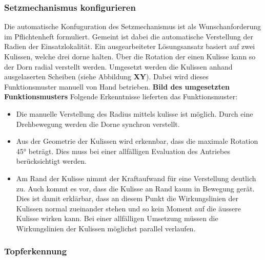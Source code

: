 \subsubsection{Setzmechanismus konfigurieren}
Die automatische Konfuguration des Setzmechanismus ist als Wunschanforderung im Pflichtenheft formuliert. Gemeint ist dabei die automatische Verstellung der Radien der Einsatzlokalität. Ein ausgearbeiteter Lösungsansatz basiert auf zwei Kulissen, welche drei dorne halten. Über die Rotation der einen Kulisse kann so der Dorn radial verstellt werden. Umgesetzt werden die Kulissen anhand ausgelaserten Scheiben (siehe Abbildung \textbf{XY}). Dabei wird dieses Funktionsmuster manuell von Hand betrieben.
\newline
\textbf{Bild des umgesetzten Funktionsmusters}
\newline
Folgende Erkenntnisse lieferten das Funktionsmuster:
\begin{itemize}
	\item Die manuelle Verstellung des Radius mittels kulisse ist möglich. Durch eine Drehbewegung werden die Dorne synchron verstellt.
	
	\item Aus der Geometrie der Kulissen wird erkennbar, dass die maximale Rotation 45° beträgt. Dies muss bei einer allfälligen Evaluation des Antriebes berücksichtigt werden.
	
	\item Am Rand der Kulisse nimmt der Kraftaufwand für eine Verstellung deutlich zu. Auch kommt es vor, dass die Kulisse an Rand kaum in Bewegung gerät. Dies ist damit erklärbar, dass an diesem Punkt die Wirkungslinien der Kulissen normal zueinander stehen und so kein Moment auf die äussere Kulisse wirken kann. Bei einer allfälligen Umsetzung müssen die Wirkungslinien der Kulissen möglichst parallel verlaufen. 
\end{itemize} 
\subsubsection{Topferkennung}
